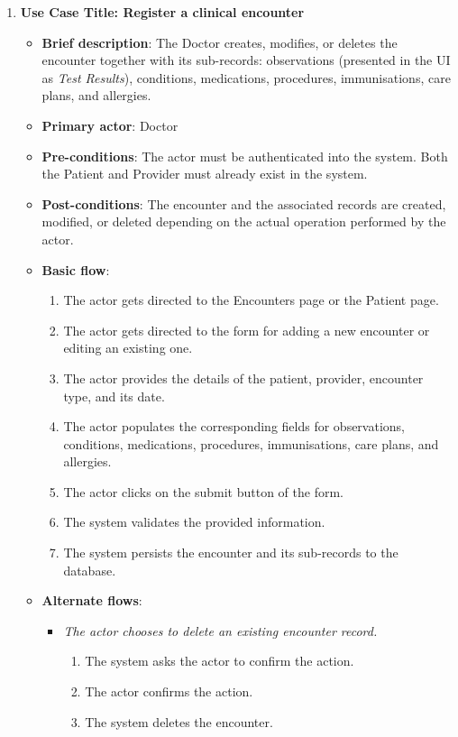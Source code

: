 \begin{enumerate}
\item \textbf{Use Case Title: Register a clinical encounter}
\begin{itemize}
    \item \textbf{Brief description}: The Doctor creates, modifies, or deletes the encounter together with its sub-records: observations (presented in the UI as \emph{Test Results}), conditions, medications, procedures, immunisations, care plans, and allergies.
    \item \textbf{Primary actor}: Doctor
    \item \textbf{Pre-conditions}: The actor must be authenticated into the system. Both the Patient and Provider must already exist in the system.
    \item \textbf{Post-conditions}: The encounter and the associated records are created, modified, or deleted depending on the actual operation performed by the actor.
    \item \textbf{Basic flow}:
    \begin{enumerate}
        \item The actor gets directed to the Encounters page or the Patient page.
        \item The actor gets directed to the form for adding a new encounter or editing an existing one.
        \item The actor provides the details of the patient, provider, encounter type, and its date.
        \item The actor populates the corresponding fields for observations, conditions, medications, procedures, immunisations, care plans, and allergies.
        \item The actor clicks on the submit button of the form.
        \item The system validates the provided information.
        \item The system persists the encounter and its sub-records to the database.
    \end{enumerate}
    \item \textbf{Alternate flows}:
    \begin{itemize}
        \item[2a.] \textit{The actor chooses to delete an existing encounter record.}
        \begin{enumerate}
            \item The system asks the actor to confirm the action.
            \item The actor confirms the action.
            \item The system deletes the encounter.

\end{enumerate}
\end{itemize}
\end{itemize}
\end{enumerate}
